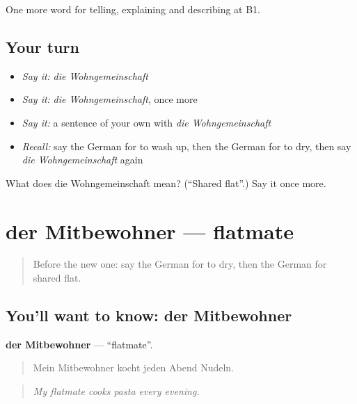 \begin{grammarlens}[title={What you've built}]
One more word for telling, explaining and describing at B1.
\end{grammarlens}

\subsection*{Your turn}
\begin{itemize}
\raggedright
  \item \emph{Say it:} \emph{die Wohngemeinschaft}
  \item \emph{Say it:} \emph{die Wohngemeinschaft}, once more
  \item \emph{Say it:} a sentence of your own with \emph{die Wohngemeinschaft}
  \item \emph{Recall:} say the German for to wash up, then the German for to dry, then say \emph{die Wohngemeinschaft} again
\end{itemize}

\begin{tcolorbox}[breakable,colback=teal!4,colframe=teal!35!black,title={Before you move on}]
What does die Wohngemeinschaft mean? (\textquotedblleft{}Shared flat\textquotedblright{}.) Say it once more.
\end{tcolorbox}
\section[der Mitbewohner]{der Mitbewohner — flatmate}

\label{lesson:GE-C532-mitbewohner}



\begin{quote}
Before the new one: say the German for to dry, then the German for shared flat.
\end{quote}

\subsection*{You'll want to know: der Mitbewohner}
\textbf{der Mitbewohner} — \textquotedblleft{}flatmate\textquotedblright{}.

\begin{quote}
Mein Mitbewohner kocht jeden Abend Nudeln.
\end{quote}

\begin{quote}
\emph{My flatmate cooks pasta every evening.}
\end{quote}

